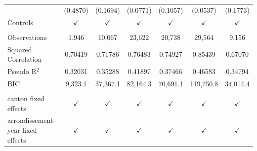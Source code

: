 \begin{tabular}{lcccccc}
                                     & (0.4870)      & (0.1694)      & (0.0771)         & (0.1057)       & (0.0537)      & (0.1773)\\   
   Controls                          & $\checkmark$  & $\checkmark$  & $\checkmark$     & $\checkmark$   & $\checkmark$  & $\checkmark$\\   
    \\
   Observations                      & 1,946         & 10,067        & 23,622           & 20,738         & 29,564        & 9,156\\  
   Squared Correlation               & 0.70419       & 0.71786       & 0.76483          & 0.74927        & 0.85439       & 0.67070\\  
   Pseudo R$^2$                      & 0.32031       & 0.35288       & 0.41897          & 0.37466        & 0.46583       & 0.34794\\  
   BIC                               & 9,323.1       & 37,367.1      & 82,164.3         & 70,691.1       & 119,750.8     & 34,014.4\\  
    \\
   canton fixed effects              & $\checkmark$  & $\checkmark$  & $\checkmark$     & $\checkmark$   & $\checkmark$  & $\checkmark$\\   
   arrondissement-year fixed effects & $\checkmark$  & $\checkmark$  & $\checkmark$     & $\checkmark$   & $\checkmark$  & $\checkmark$\\   
   \bottomrule
\end{tabular}
\par\endgroup


